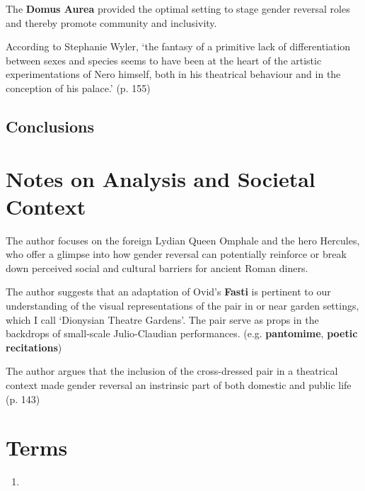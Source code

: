 The \textbf{Domus Aurea} provided the optimal setting to stage gender reversal roles and thereby promote community and inclusivity.

\begin{rmk}
    According to Stephanie Wyler, `the fantasy of a primitive lack of differentiation between sexes and species seems to have been at the heart of the artistic experimentations of Nero himself, both in his theatrical behaviour and in the conception of his palace.' (p. 155)
\end{rmk}


\subsection{Conclusions}









\section{Notes on Analysis and Societal Context}
\label{sec:SocCont15}

The author focuses on the foreign Lydian Queen Omphale and the hero Hercules, who offer a glimpse into how gender reversal can potentially reinforce or break down perceived social and cultural barriers for ancient Roman diners.

The author suggests that an adaptation of Ovid's \textbf{Fasti} is pertinent to our understanding of the visual representations of the pair in or near garden settings, which I call `Dionysian Theatre Gardens'. The pair serve as props in the backdrops of small-scale Julio-Claudian performances. (e.g. \textbf{pantomime}, \textbf{poetic recitations})

The author argues that the inclusion of the cross-dressed pair in a theatrical context made gender reversal an instrinsic part of both domestic and public life (p. 143)




\section{Terms}
\label{sec:terms15}

\begin{enumerate}
	\item
\end{enumerate}



